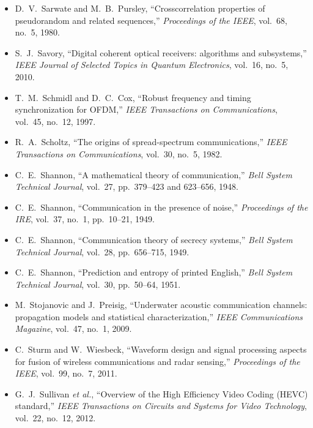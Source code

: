 \begin{itemize}[leftmargin=1.5em,itemindent=-1.5em,itemsep=1.5pt plus 1pt,parsep=0pt,topsep=4pt,label={}]
\item D.~V.~Sarwate and M.~B.~Pursley, ``Crosscorrelation properties of pseudorandom and related sequences,'' \emph{Proceedings of the IEEE}, vol.~68, no.~5, 1980.
\item S.~J.~Savory, ``Digital coherent optical receivers: algorithms and subsystems,'' \emph{IEEE Journal of Selected Topics in Quantum Electronics}, vol.~16, no.~5, 2010.
\item T.~M.~Schmidl and D.~C.~Cox, ``Robust frequency and timing synchronization for OFDM,'' \emph{IEEE Transactions on Communications}, vol.~45, no.~12, 1997.
\item R.~A.~Scholtz, ``The origins of spread-spectrum communications,'' \emph{IEEE Transactions on Communications}, vol.~30, no.~5, 1982.
\item C.~E.~Shannon, ``A mathematical theory of communication,'' \emph{Bell System Technical Journal}, vol.~27, pp.~379--423 and 623--656, 1948.
\item C.~E.~Shannon, ``Communication in the presence of noise,'' \emph{Proceedings of the IRE}, vol.~37, no.~1, pp.~10--21, 1949.
\item C.~E.~Shannon, ``Communication theory of secrecy systems,'' \emph{Bell System Technical Journal}, vol.~28, pp.~656--715, 1949.
\item C.~E.~Shannon, ``Prediction and entropy of printed English,'' \emph{Bell System Technical Journal}, vol.~30, pp.~50--64, 1951.
\item M.~Stojanovic and J.~Preisig, ``Underwater acoustic communication channels: propagation models and statistical characterization,'' \emph{IEEE Communications Magazine}, vol.~47, no.~1, 2009.
\item C.~Sturm and W.~Wiesbeck, ``Waveform design and signal processing aspects for fusion of wireless communications and radar sensing,'' \emph{Proceedings of the IEEE}, vol.~99, no.~7, 2011.
\item G.~J.~Sullivan \emph{et al.}, ``Overview of the High Efficiency Video Coding (HEVC) standard,'' \emph{IEEE Transactions on Circuits and Systems for Video Technology}, vol.~22, no.~12, 2012.

\end{itemize}
